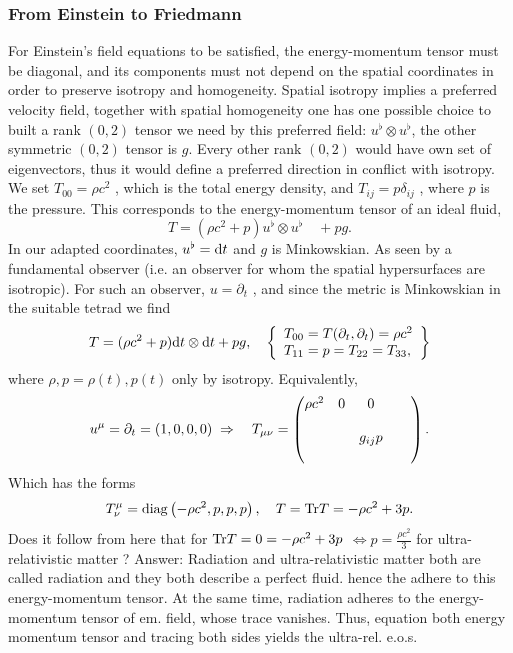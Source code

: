 \subsubsection{From Einstein to Friedmann}
For Einstein’s field equations to be satisfied, the energy-momentum
tensor must be diagonal, and its components must not depend on the
spatial coordinates in order to preserve isotropy and homogeneity. Spatial isotropy implies a preferred velocity field, together with spatial homogeneity one has one possible choice to built a rank $(0,2)$ tensor we need  by this preferred field: $u^{\flat} \otimes u^{\flat}$, the other symmetric $(0,2)$ tensor is $g$. Every other rank $(0,2)$ would have own set of eigenvectors, thus it would define a preferred direction in conflict with isotropy. We
set $T_{00} = ρc^2$ , which is the total energy density, and $T_{ij} = p δ_{i j}$ , where $p$
is the pressure.
This corresponds to the energy-momentum tensor of an ideal fluid,
\begin{equation}
T = (\rho c^2 + p) u^{\flat} \otimes u^{\flat}\quad + p g.
\end{equation}
In our adapted coordinates, $u^{\flat} = \mathrm{d} t$ and $g$ is Minkowskian. As seen by a fundamental observer (i.e. an observer for whom the spatial
hypersurfaces are isotropic). For such an observer, $u = \partial_t$ , and since the
metric is Minkowskian in the suitable tetrad we find
\begin{equation}
T = (\rho c^2+p) \mathrm{d} t\otimes \mathrm{d} t+ pg, \quad \left\{	\begin{array}{lr}
T_{00} = T(\partial_t,\partial_t) = \rho c^2 \\
T_{11} = p = T_{22} = T_{33},
\end{array}		\right\}
\end{equation}
where $\rho,p = \rho(t), p(t)$ only by isotropy. Equivalently, 
\begin{equation}
u^\mu= \partial_t=(1,0,0,0) \; \Rightarrow \quad T_{\mu \nu}=\begin{pmatrix}
\rho c^2 &0&0&\\
&&&&\\
&&g_{ij} p&&\\
&&&&
\end{pmatrix}.
\end{equation}
Which has the forms
\begin{equation}
T^\mu_\nu = \mathrm{diag}\left(-\rho c^2,p,p,p\right),\quad T= \mathrm{Tr} T = -\rho c^2+ 3p.
\end{equation}
Does it follow from here that for $\mathrm{Tr} T=0=-\rho c^2+3p$ $\Leftrightarrow p=\frac{\rho c^2}{3}$ for ultra-relativistic matter ? Answer: Radiation and ultra-relativistic matter both are called radiation and they both describe a perfect fluid. hence the adhere to this energy-momentum tensor. At the same time, radiation adheres to the energy-momentum tensor of em. field, whose trace vanishes. Thus, equation both energy momentum tensor and tracing both sides yields the ultra-rel. e.o.s.

